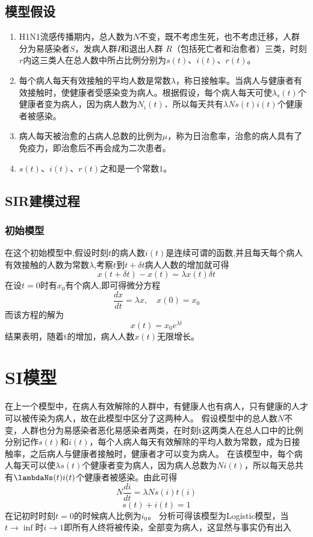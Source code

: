 \documentclass[supercite]{HustGraduPaper}
\begin{document}
	\subsection{模型假设}
	\begin{enumerate}
		\item H1N1流感传播期内，总人数为$N$不变，既不考虑生死，也不考虑迁移，人群分为易感染者$S$，发病人群$I$和退出人群 $R$（包括死亡者和治愈者）三类，时刻$r$内这三类人在总人数中所占比例分别为$s(t)$、$i(t)$、$r(t)$。
		\item 每个病人每天有效接触的平均人数是常数$\lambda$，称日接触率。当病人与健康者有效接触时，使健康者受感染变为病人。根据假设，每个病人每天可使$\lambda_s(t)$个健康者变为病人，因为病人数为$N_i(t)$．所以每天共有$\lambda N s(t) i(t)$个健康者被感染。
		\item 病人每天被治愈的占病人总数的比例为$\mu$，称为日治愈率，治愈的病人具有了免疫力，即治愈后不再会成为二次患者。
		\item $s(t)$、$i(t)$、$r(t)$之和是一个常数$1$。
	\end{enumerate}

	\subsection{SIR建模过程}
	\subsubsection{初始模型}
	在这个初始模型中,假设时刻$t$的病人数$i(t)$是连续可谓的函数,并且每天每个病人有效接触的人数为常数$\lambda$,考察$t$到$t+\delta t$病人人数的增加就可得$$x(t+\delta t)-x(t) = \lambda x(t) \delta t$$
	在设$t = 0$时有$x_0$有个病人,即可得微分方程$$\frac{dx}{dt} = \lambda x, \quad x(0)=x_0$$
而该方程的解为$$x(t)=x_0e^{\lambda t}$$结果表明，随着t的增加，病人人数$x(t)$无限增长。

	\section{SI模型}
	在上一个模型中，在病人有效解除的人群中，有健康人也有病人，只有健康的人才可以被传染为病人，故在此模型中区分了这两种人。
	假设模型中的总人数$N$不变，人群也分为易感染者恶化易感染者两类，在时刻t这两类人在总人口中的比例分别记作$s(t)和i(t)$，每个人病人每天有效解除的平均人数为常数，成为日接触率，之后病人与健康者接触时，健康者才可以变为病人。
	在该模型中，每个病人每天可以使$\lambda s(t)$个健康者变为病人，因为病人总数为$Ni(t)$，所以每天总共有$\lambdaNs(t)i(t)$个健康者被感染。由此可得$$N\frac{di}{dt} = \lambda N s(i)t(i)$$  $$s(t)+i(t) = 1$$在记初时时刻$t=0$的时候病人比例为$i_0$。
	分析可得该模型为Logistic模型，当$t \to \inf$时$i \to 1$即所有人终将被传染，全部变为病人，这显然与事实仍有出入
	
\end{document}
